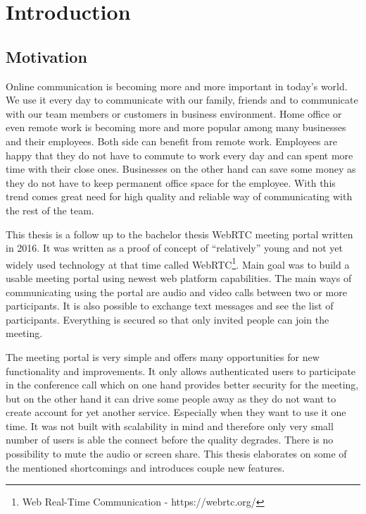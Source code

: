 \documentclass[
  digital, %
  table,   %
  lof,     %
  nolot,     %
]{fithesis3}
\begin{document}
\chapter{Introduction}
\section{Motivation}
Online communication is becoming more and more important in today’s world. We use it every day to communicate with our family, friends and to communicate with our team members or customers in business environment. Home office or even remote work is becoming more and more popular among many businesses and their employees. Both side can benefit from remote work. Employees are happy that they do not have to commute to work every day and can spent more time with their close ones. Businesses on the other hand can save some money as they do not have to keep permanent office space for the employee. With this trend comes great need for high quality and reliable way of communicating with the rest of the team.

This thesis is a follow up to the bachelor thesis WebRTC meeting portal  \cite{bachelorThesis} written in 2016. It was written as a proof of concept of “relatively” young and not yet widely used technology at that time called WebRTC\footnote{Web Real-Time Communication - https://webrtc.org/
}. Main goal was to build a usable meeting portal using newest web platform capabilities. The main ways of communicating using the portal are audio and video calls between two or more participants. It is also possible to exchange text messages and see the list of participants. Everything is secured so that only invited people can join the meeting.

The meeting portal is very simple and offers many opportunities for new functionality and improvements. It only allows authenticated users to participate in the conference call which on one hand provides better security for the meeting, but on the other hand it can drive some people away as they do not want to create account for yet another service. Especially when they want to use it one time. It was not built with scalability in mind and therefore only very small number of users is able the connect before the quality degrades. There is no possibility to mute the audio or screen share. This thesis elaborates on some of the mentioned shortcomings and introduces couple new features.
\end{document}
